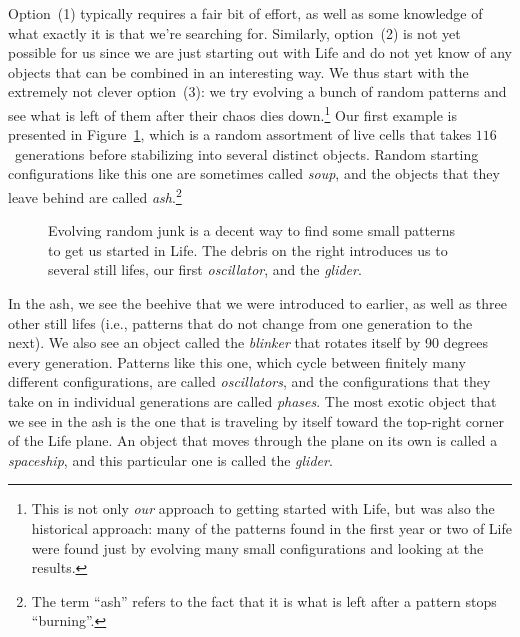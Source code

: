 Option~(1) typically requires a fair bit of effort, as well as some knowledge of what exactly it is that we're searching for. Similarly, option~(2) is not yet possible for us since we are just starting out with Life and do not yet know of any objects that can be combined in an interesting way. We thus start with the extremely not clever option~(3): we try evolving a bunch of random patterns and see what is left of them after their chaos dies down.\footnote{This is not only \emph{our} approach to getting started with Life, but was also the historical approach: many of the patterns found in the first year or two of Life were found just by evolving many small configurations and looking at the results.} Our first example is presented in Figure~\ref{fig:random_1}, which is a random assortment of live cells that takes $116$~generations before stabilizing into several distinct objects. Random starting configurations like this one are sometimes called \emph{soup}, and the objects that they leave behind are called \emph{ash}.\footnote{The term ``ash'' refers to the fact that it is what is left after a pattern stops ``burning''.}

\begin{figure}[!htb]
	\centering{}
	\caption{Evolving random junk is a decent way to find some small patterns to get us started in Life. The debris on the right introduces us to several still lifes, our first \emph{oscillator}, and the \emph{glider}.}\label{fig:random_1}
\end{figure}

In the ash, we see the beehive that we were introduced to earlier, as well as three other still lifes (i.e., patterns that do not change from one generation to the next). We also see an object called the \emph{blinker} that rotates itself by 90 degrees every generation. Patterns like this one, which cycle between finitely many different configurations, are called \emph{oscillators}, and the configurations that they take on in individual generations are called \emph{phases}. The most exotic object that we see in the ash is the one that is traveling by itself toward the top-right corner of the Life plane. An object that moves through the plane on its own is called a \emph{spaceship}, and this particular one is called the \emph{glider}.

